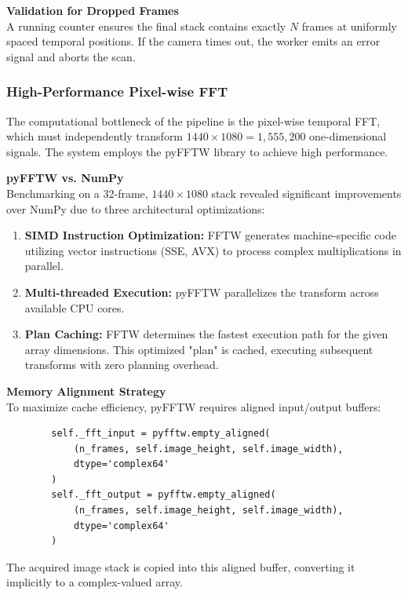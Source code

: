 \documentclass[12pt,a4paper]{article}
\begin{document}
        \textbf{Validation for Dropped Frames} \\
        A running counter ensures the final stack contains exactly $N$ frames at uniformly spaced temporal positions. If the camera times out, the worker emits an error signal and aborts the scan.

        \subsubsection{High-Performance Pixel-wise FFT}
        The computational bottleneck of the pipeline is the pixel-wise temporal \ac{FFT}, which must independently transform $1440 \times 1080 = 1,555,200$ one-dimensional signals. The system employs the pyFFTW library \cite{pyfftw} to achieve high performance.

        \textbf{pyFFTW vs. NumPy} \\
        Benchmarking on a 32-frame, $1440\times1080$ stack revealed significant improvements over NumPy due to three architectural optimizations:
        \begin{enumerate}
            \item \textbf{\ac{SIMD} Instruction Optimization:} \ac{FFTW} generates machine-specific code utilizing vector instructions (SSE, AVX) to process complex multiplications in parallel.
            \item \textbf{Multi-threaded Execution:} pyFFTW parallelizes the transform across available CPU cores.
            \item \textbf{Plan Caching:} \ac{FFTW} determines the fastest execution path for the given array dimensions. This optimized "plan" is cached, executing subsequent transforms with zero planning overhead.
        \end{enumerate}

        \textbf{Memory Alignment Strategy} \\
        To maximize cache efficiency, pyFFTW requires aligned input/output buffers:
        \begin{verbatim}
        self._fft_input = pyfftw.empty_aligned(
            (n_frames, self.image_height, self.image_width), 
            dtype='complex64'
        )
        self._fft_output = pyfftw.empty_aligned(
            (n_frames, self.image_height, self.image_width), 
            dtype='complex64'
        )
        \end{verbatim}
        The acquired image stack is copied into this aligned buffer, converting it implicitly to a complex-valued array.
\end{document}
